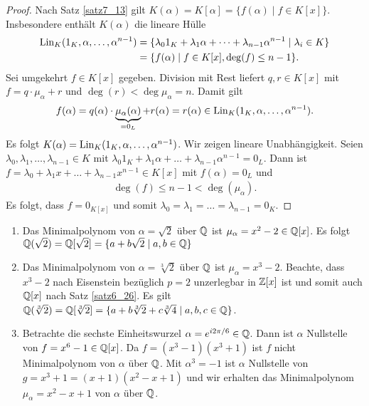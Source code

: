 \begin{proof}
	Nach Satz \ref{satz7_13} gilt $K(\alpha) = K[\alpha] = \{f(\alpha) \mid f \in K[x]\}$. Insbesondere enthält $K(\alpha)$ die lineare Hülle 
	\begin{align*}
		\operatorname{Lin}_K(1_K, \alpha, \dots, \alpha^{n-1}) &= \{\lambda_0 1_K + \lambda_1 \alpha + \dots + \lambda_{n-1} \alpha^{n-1} \mid \lambda_i \in K\}\\
		&= \{f(\alpha) \mid f \in K[x], \deg(f) \leq n - 1\}.
	\end{align*}
	Sei umgekehrt $f \in K[x]$ gegeben. Division mit Rest liefert $q,r \in K[x]$ mit $f = q \cdot \mu_\alpha + r$ und $\deg(r) < \deg{\mu_\alpha} = n$. Damit gilt 
	\begin{align*}
		f(\alpha) = q(\alpha) \cdot \underbrace{\mu_{\alpha}(\alpha)}_{=0_L} + r(\alpha) = r(\alpha) \in \operatorname{Lin}_K(1_K, \alpha, \dots, \alpha^{n-1}).
	\end{align*}
	Es folgt $K(\alpha) = \operatorname{Lin}_K(1_K, \alpha, \dots, \alpha^{n-1})$. Wir zeigen lineare Unabhängigkeit. Seien $\lambda_0, \lambda_1, \dots, \lambda_{n-1} \in K$ mit $\lambda_0 1_K + \lambda_1 \alpha + \dots + \lambda_{n-1} \alpha^{n-1} = 0_L$. Dann ist $f = \lambda_0 + \lambda_1 x + \dots + \lambda_{n-1} x^{n-1} \in K[x]$ mit $f(\alpha) = 0_L$ und 
	\begin{align*}
		\deg(f) \leq n - 1 < \deg(\mu_\alpha).
	\end{align*}
	Es folgt, dass $f = 0_{K[x]}$ und somit $\lambda_0 = \lambda_1 = \dots = \lambda_{n-1} = 0_K$. 
\end{proof}
\begin{beispiel}\label{beispiel7_15}
	\begin{enumerate}[label=(\arabic*)]
		\item Das Minimalpolynom von $\alpha = \sqrt{2}$ über $\mathbb{Q}$ ist $\mu_\alpha = x^2 - 2 \in \mathbb{Q}[x]$. Es folgt $\mathbb{Q}(\sqrt{2}) = \mathbb{Q}[\sqrt{2}] = \{a + b\sqrt{2} \mid a,b \in \mathbb{Q}\}$
		\item Das Minimalpolynom von $\alpha = \sqrt[3]{2}$ über $\mathbb{Q}$ ist $\mu_\alpha = x^3 - 2$. Beachte, dass $x^3 - 2$ nach Eisenstein bezüglich $p=2$ unzerlegbar in $\mathbb{Z}[x]$ ist und somit auch $\mathbb{Q}[x]$ nach Satz \ref{satz6_26}. Es gilt $\mathbb{Q}(\sqrt[3]{2}) = \mathbb{Q}[\sqrt[3]{2}] = \{a + b\sqrt[3]{2} + c\sqrt[3]{4} \mid a,b,c \in \mathbb{Q}\}$.
		\item Betrachte die sechste Einheitswurzel $\alpha = e^{i 2\pi/6} \in \mathbb{Q}$. Dann ist $\alpha$ Nullstelle von $f=x^6 - 1 \in \mathbb{Q}[x]$. Da $f = (x^3 - 1)(x^3 + 1)$ ist $f$ nicht Minimalpolynom von $\alpha$ über $\mathbb{Q}$. Mit $\alpha^3 = -1$ ist $\alpha$ Nullstelle von $g = x^3 + 1 = (x+1)(x^2 - x + 1)$ und wir erhalten das Minimalpolynom $\mu_\alpha = x^2 - x + 1$ von $\alpha$ über $\mathbb{Q}$.
	\end{enumerate}
\end{beispiel}
